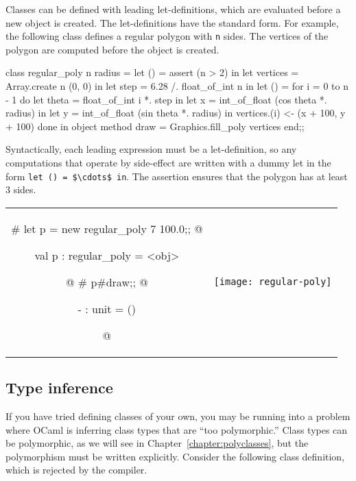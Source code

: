 \label{classes:let}
\label{classes!let expressions}
Classes can be defined with leading let-definitions, which are evaluated before a new object is
created.  The let-definitions have the standard form.  For example, the following class defines a
regular polygon with \hbox{\lstinline/n/} sides.  The vertices of the polygon are computed before the
object is created.

\begin{ocaml}
class regular_poly n radius =
   let () = assert (n > 2) in
   let vertices = Array.create n (0, 0) in
   let step = 6.28 /. float_of_int n in
   let () =
      for i = 0 to n - 1 do
         let theta = float_of_int i *. step in
         let x = int_of_float (cos theta *. radius) in
         let y = int_of_float (sin theta *. radius) in
         vertices.(i) <- (x + 100, y + 100)
      done
   in
   object
      method draw = Graphics.fill_poly vertices
   end;;
\end{ocaml}
%
Syntactically, each leading expression must be a let-definition, so any computations that operate by
side-effect are written with a dummy let in the form \hbox{\lstinline/let () = $\cdots$ in/}.  The
assertion ensures that the polygon has at least 3 sides.

\begin{center}
\begin{tabular}{cc}
\begin{minipage}[b]{3in}
\begin{ocamllistingx}
# let p = new regular_poly 7 100.0;;
@
\begin{topoutput}
val p : regular_poly = <obj>
\end{topoutput}
@
# p#draw;;
@
\begin{topoutput}
- : unit = ()
\end{topoutput}
@
\end{ocamllistingx}
\end{minipage}
&
\texttt{[image: regular-poly]}
\end{tabular}
\end{center}

\subsection{Type inference}

If you have tried defining classes of your own, you may be running into a problem where OCaml is
inferring class types that are ``too polymorphic.''  Class types can be polymorphic, as we will see
in Chapter~\ref{chapter:polyclasses}, but the polymorphism must be written explicitly.  Consider the
following class definition, which is rejected by the compiler.

